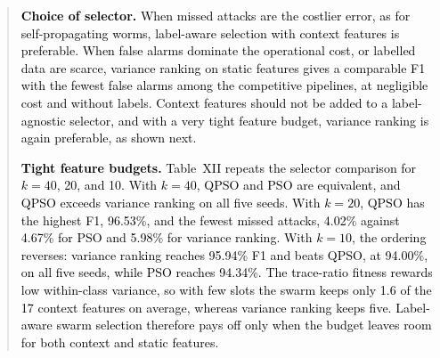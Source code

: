 \documentclass[11pt]{article}
\newenvironment{excerpt}{\begin{quote}\sloppy}{\end{quote}}
\begin{document}
\begin{excerpt}
\textcolor{black}{\textbf{Choice of selector.} When
missed attacks are the costlier error, as for self-propagating worms,
label-aware selection with context features is preferable. When false
alarms dominate the operational cost, or labelled data are scarce,
variance ranking on static features gives a comparable F1 with the
fewest false alarms among the competitive pipelines, at negligible
cost and without labels. Context features should not be added to a
label-agnostic selector, and with a very tight feature budget,
variance ranking is again preferable, as shown next.}

\textcolor{black}{\textbf{Tight feature budgets.}
Table~XII repeats the selector comparison for $k=40$, 20,
and 10. With $k=40$, QPSO and PSO are equivalent, and QPSO exceeds
variance ranking on all five seeds. With $k=20$, QPSO has the highest
F1, 96.53\%, and the fewest missed attacks, 4.02\% against 4.67\% for
PSO and 5.98\% for variance ranking. With $k=10$, the ordering
reverses: variance ranking reaches 95.94\% F1 and beats QPSO, at
94.00\%, on all five seeds, while PSO reaches 94.34\%. The trace-ratio
fitness rewards low within-class variance, so with few slots the
swarm keeps only 1.6 of the 17 context features on average, whereas
variance ranking keeps five. Label-aware swarm selection therefore
pays off only when the budget leaves room for both context and static
features.}

\setcounter{table}{11}
\begin{table}[H]
\centering
\scriptsize
\caption{\textcolor{black}{Selector comparison under feature budgets of 40, 20, and 10 over five seeds; the consensus mask uses ten. Ctx.: context features kept. Wins: seeds on which QPSO has the higher F1.}}


\end{table}
\end{excerpt}
\end{document}
